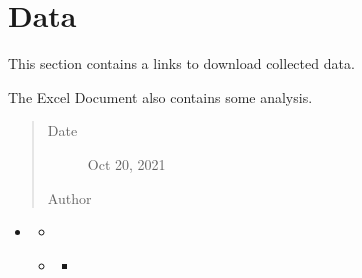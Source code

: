 \documentclass[letterpaper,10pt,english]{sphinxmanual}
\begin{document}
\chapter{Data}
\label{\detokenize{data:data}}\label{\detokenize{data:data-page}}\label{\detokenize{data::doc}}
\begin{sphinxShadowBox}

\sphinxAtStartPar
This section contains a links to download collected data.

\sphinxAtStartPar
The Excel Document also contains some analysis.
\begin{quote}\begin{description}
\item[{Date}] \leavevmode
\sphinxAtStartPar
Oct 20, 2021

\item[{Author}] \leavevmode
\sphinxAtStartPar
{}

\end{description}\end{quote}
\end{sphinxShadowBox}

\begin{sphinxShadowBox}
\begin{itemize}
\item {} 
\sphinxAtStartPar
{}\label{\detokenize{data:id2}}{\hyperref[\detokenize{data:data}]{}}
\begin{itemize}
\item {} 
\sphinxAtStartPar
{}\label{\detokenize{data:id3}}{\hyperref[\detokenize{data:current-data}]{}}

\item {} 
\sphinxAtStartPar
{}\label{\detokenize{data:id4}}{\hyperref[\detokenize{data:archived-data}]{}}
\begin{itemize}
\item {} 
\sphinxAtStartPar
{}\label{\detokenize{data:id5}}{\hyperref[\detokenize{data:id1}]{}}

\end{itemize}

\end{itemize}

\end{itemize}
\end{sphinxShadowBox}
\end{document}
